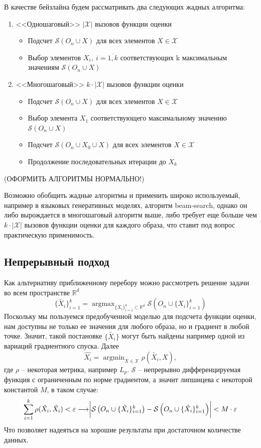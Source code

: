 \documentclass[a4paper,12pt]{article}
\DeclareMathOperator*{\argmax}{argmax}
\DeclareMathOperator*{\argmin}{argmin}
\begin{document}
			В качестве бейзлайна будем рассматривать два следующих жадных алгоритма:
			\begin{enumerate}
				\item <<Одношаговый>> $|\mathcal{X}|$ вызовов функции оценки
				\begin{itemize}
					\item Подсчет $\mathcal{S}(O_n \cup X)$ для всех элементов $X\in \mathcal{X}$
					\item Выбор элементов $X_i,~i=\overline{1,k}$ соответствующих k максимальным значениям $\mathcal{S}(O_n \cup X)$
				\end{itemize}
				\item <<Многошаговый>> $k\cdot|\mathcal{X}|$ вызовов функции оценки
				\begin{itemize}
					\item Подсчет $\mathcal{S}(O_n \cup X)$ для всех элементов $X\in \mathcal{X}$
					\item Выбор элемента $X_1$ соответствующего максимальному значению $\mathcal{S}(O_n \cup X)$
					\item Подсчет $\mathcal{S}(O_n \cup X_0\cup X)$ для всех элементов $X\in \mathcal{X}$
					\item Продолжение последовательных итерации до $X_k$
				\end{itemize}
			\end{enumerate}
			(ОФОРМИТЬ АЛГОРИТМЫ НОРМАЛЬНО!)
			
			Возможно обобщить жадные алгоритмы и применить широко используемый, например в языковых генеративных моделях, алгоритм beam-search, однако он либо вырождается в многошаговый алгоритм выше, либо требует еще больше чем $k\cdot|\mathcal{X}|$ вызовов функции оценки для каждого образа, что ставит под вопрос практическую применимость.
			
			\subsection{Непрерывный подход}
			Как альтернативу приближенному перебору можно рассмотреть решение задачи во всем пространстве $\mathbb{R}^d$
			$$\{\tilde{X_i}\}_{i=1}^k= \argmax_{\{X_i\}_{i=1}^k\subset\mathbb{R}^d} \mathcal{S}\left(O_n\cup\{X_i\}_{i=1}^k\right)$$
			Поскольку мы пользуемся предобученной моделью для подсчета функции оценки, нам доступны не только ее значения для любого образа, но и градиент в любой точке. Значит, такой постановке $\{\tilde{X_i}\}$ могут быть найдены например одной из вариаций градиентного спуска.
			Далее 
			$$\hat{X_i} =  \argmin_{X\in\mathcal{X}} \rho(\tilde{X_i}, X),$$
			где $\rho$ -- некоторая метрика, например $L_p$. 
			$\mathcal{S}$ -- непрерывно дифференцируемая функция с ограниченным по норме градиентом, а значит липшицева с некоторой константой $M$, в таком случае:
			$$\sum_{i=1}^k\rho(\hat{X_i}, \tilde{X_i}) < \varepsilon\longrightarrow \biggr{|}\mathcal{S}\left(O_n\cup\{\tilde{X_i}\}_{i=1}^k\right) - \mathcal{S}\left(O_n\cup\{\hat{X_i}\}_{i=1}^k\right)\biggr{|} < M\cdot\varepsilon$$
			Что позволяет надеяться на хорошие результаты при достаточном количестве данных.
			
\end{document}
